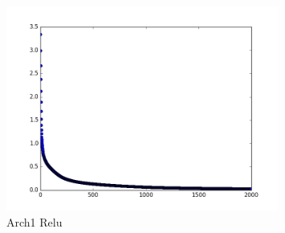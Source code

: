 \documentclass{article}
\begin{document}
\begin{figure}[H]
  \caption{Arch1 Relu}
  \centering
  \includegraphics[width=0.8\textwidth]{arch1relu}
\end{figure}
\end{document}
